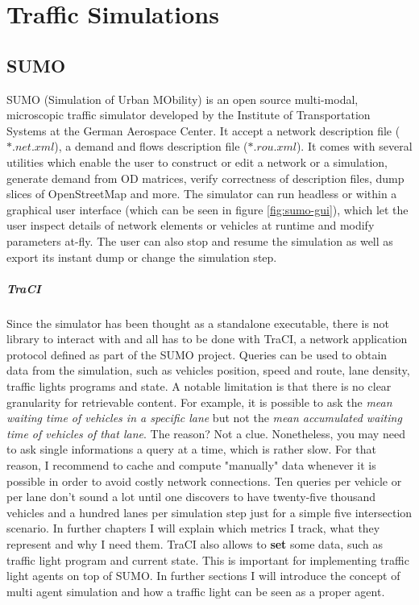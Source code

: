 \chapter{Traffic Simulations}

\section{SUMO}

SUMO (Simulation of Urban MObility) is an open source multi-modal, microscopic traffic simulator developed by the Institute of Transportation Systems at the German Aerospace Center. It accept a network description file ($*.net.xml$), a demand and flows description file ($*.rou.xml$). It comes with several utilities which enable the user to construct or edit a network or a simulation, generate demand from OD matrices, verify correctness of description files, dump slices of OpenStreetMap and more. The simulator can run headless or within a graphical user interface (which can be seen in figure \ref{fig:sumo-gui}), which let the user inspect details of network elements or vehicles at runtime and modify parameters at-fly. The user can also stop and resume the simulation as well as export its instant dump or change the simulation step.


\paragraph{TraCI}

Since the simulator has been thought as a standalone executable, there is not library to interact with and all has to be done with TraCI, a network application protocol defined as part of the SUMO project. Queries can be used to obtain data from the simulation, such as vehicles position, speed and route, lane density, traffic lights programs and state. A notable limitation is that there is no clear granularity for retrievable content. For example, it is possible to ask the \textit{mean waiting time of vehicles in a specific lane} but not the \textit{mean accumulated waiting time of vehicles of that lane}. The reason? Not a clue. Nonetheless, you may need to ask single informations a query at a time, which is rather slow. For that reason, I recommend to cache and compute "manually" data whenever it is possible in order to avoid costly network connections. Ten queries per vehicle or per lane don't sound a lot until one discovers to have twenty-five thousand vehicles and a hundred lanes per simulation step just for a simple five intersection scenario. In further chapters I will explain which metrics I track, what they represent and why I need them. TraCI also allows to \textbf{set} some data, such as traffic light program and current state. This is important for implementing traffic light agents on top of SUMO. In further sections I will introduce the concept of multi agent simulation and how a traffic light can be seen as a proper agent.

